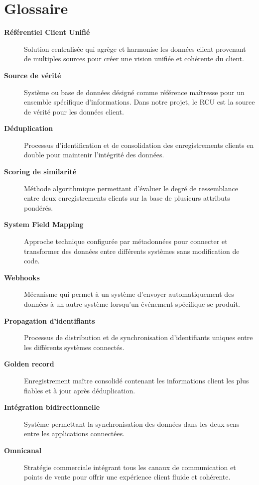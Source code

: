 \documentclass[12pt,a4paper,openany,oneside]{report}
\begin{document}
\section*{Glossaire}
\begin{description}
    \item[\textbf{Référentiel Client Unifié}] Solution centralisée qui agrège et harmonise les données client provenant de multiples sources pour créer une vision unifiée et cohérente du client.
    
    \item[\textbf{Source de vérité}] Système ou base de données désigné comme référence maîtresse pour un ensemble spécifique d'informations. Dans notre projet, le RCU est la source de vérité pour les données client.
    
    \item[\textbf{Déduplication}] Processus d'identification et de consolidation des enregistrements clients en double pour maintenir l'intégrité des données.
    
    \item[\textbf{Scoring de similarité}] Méthode algorithmique permettant d'évaluer le degré de ressemblance entre deux enregistrements clients sur la base de plusieurs attributs pondérés.
    
    \item[\textbf{System Field Mapping}] Approche technique configurée par métadonnées pour connecter et transformer des données entre différents systèmes sans modification de code.
    
    \item[\textbf{Webhooks}] Mécanisme qui permet à un système d'envoyer automatiquement des données à un autre système lorsqu'un événement spécifique se produit.
    
    \item[\textbf{Propagation d'identifiants}] Processus de distribution et de synchronisation d'identifiants uniques entre les différents systèmes connectés.
    
    \item[\textbf{Golden record}] Enregistrement maître consolidé contenant les informations client les plus fiables et à jour après déduplication.
    
    \item[\textbf{Intégration bidirectionnelle}] Système permettant la synchronisation des données dans les deux sens entre les applications connectées.
    
    \item[\textbf{Omnicanal}] Stratégie commerciale intégrant tous les canaux de communication et points de vente pour offrir une expérience client fluide et cohérente.
    

\end{description}
\end{document}
